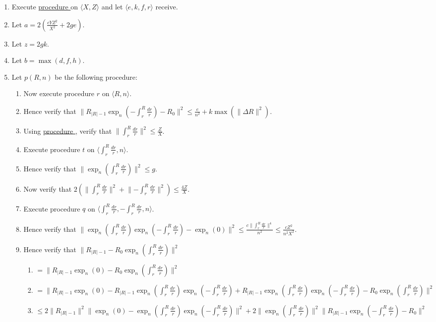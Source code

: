 \documentclass{article}
\newcounter{procedure}[part]
\newcommand{\procedurehr}[1]{\hyperref[sec:procedure #1]{procedure \expandafter\csname procedure#1\endcsname}}
\begin{document}
\begin{multicols}{2}
\begin{enumerate}
					\item Execute \procedurehr{3.42} on $\langle X,Z\rangle$ and let $\langle e,k,f,r\rangle$ receive.
					\item Let $a=2(\frac{cYZ^2}{X^2}+2ge)$.
					\item Let $z=2gk$.
					\item Let $b=\max(d,f,h)$.
					\item Let $p(R,n)$ be the following procedure:
					\begin{enumerate}
						\item Now execute procedure $r$ on $\langle R,n\rangle$.
						\item Hence verify that $\lVert R_{\lvert R\rvert-1}\exp_n(-\int_r^R\frac{dr}{r})-R_0\rVert^2\le\frac{e}{n^2}+k\max(\lVert\Delta R\rVert^2)$.
						\item Using \procedurehr{3.33}, verify that $\lVert\int_r^R\frac{dr}{r}\rVert^2\le\frac{Z}{X}$.
						\item Execute procedure $t$ on $\langle\int_r^R\frac{dr}{r},n\rangle$.
						\item Hence verify that $\lVert\exp_n(\int_r^R\frac{dr}{r})\rVert^2\le g$.
						\item Now verify that $2(\lVert\int_r^R\frac{dr}{r}\rVert^2+\lVert-\int_r^R\frac{dr}{r}\rVert^2)\le\frac{4Z}{X}$.
						\item Execute procedure $q$ on $\langle\int_r^R\frac{dr}{r},-\int_r^R\frac{dr}{r},n\rangle$.
						\item Hence verify that $\lVert\exp_n(\int_r^R\frac{dr}{r})\exp_n(-\int_r^R\frac{dr}{r})-\exp_n(0)\rVert^2\le\frac{c\lVert\int_r^R\frac{dr}{r}\rVert^4}{n^2}\le\frac{cZ^2}{n^2X^2}$.
						\item Hence verify that $\lVert R_{\lvert R\rvert-1}-R_0\exp_n(\int_r^R\frac{dr}{r})\rVert^2$
						\begin{enumerate}
							\item $=\lVert R_{\lvert R\rvert-1}\exp_n(0)-R_0\exp_n(\int_r^R\frac{dr}{r})\rVert^2$
							\item $=\lVert R_{\lvert R\rvert-1}\exp_n(0)-R_{\lvert R\rvert-1}\exp_n(\int_r^R\frac{dr}{r})\exp_n(-\int_r^R\frac{dr}{r})+R_{\lvert R\rvert-1}\exp_n(\int_r^R\frac{dr}{r})\exp_n(-\int_r^R\frac{dr}{r})-R_0\exp_n(\int_r^R\frac{dr}{r})\rVert^2$
							\item $\le 2\lVert R_{\lvert R\rvert-1}\rVert^2\lVert\exp_n(0)-\exp_n(\int_r^R\frac{dr}{r})\exp_n(-\int_r^R\frac{dr}{r})\rVert^2+2\lVert\exp_n(\int_r^R\frac{dr}{r})\rVert^2\lVert R_{\lvert R\rvert-1}\exp_n(-\int_r^R\frac{dr}{r})-R_0\rVert^2$

\end{enumerate}
\end{enumerate}
\end{enumerate}
\end{multicols}
\end{document}
